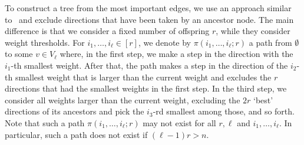 \documentclass[11pt]{article}
\theoremstyle{definition}
\theoremstyle{remark}
\theoremstyle{remark}
\numberwithin{theorem}{section}
\begin{document}
To construct a tree from the most important edges, we use an approach similar to~\cite{berestycki2016number} and exclude directions that have been taken by an ancestor node. The main difference is that we consider a fixed number of offspring $r$, while they consider weight thresholds. For $i_1,\dots,i_\ell\in[r]$, we denote by $\pi(i_1,\dots,i_\ell;r)$ a path from $\emptyset$ to some $v\in V_\ell$ where, in the first step, we make a step in the direction with the $i_1$-th smallest weight. After that, the path makes a step in the direction of the $i_2$-th smallest weight that is larger than the current weight and excludes the $r$ directions that had the smallest weights in the first step. In the third step, we consider all weights larger than the current weight, excluding the $2r$ `best' directions of its ancestors and pick the $i_3$-rd smallest among those, and so forth. Note that such a path $\pi(i_1,\dots,i_\ell;r)$ may not exist for all $r,\ell$ and $i_1,\dots,i_\ell$. In particular, such a path does not exist if $(\ell-1)r>n$.
\end{document}
